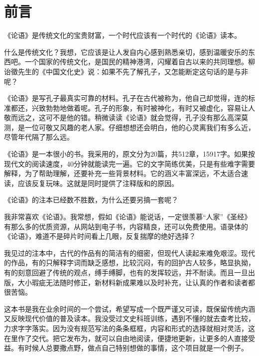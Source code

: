 \chapter*{前\qquad 言}

《论语》是传统文化的宝贵财富，一个时代应该有一个时代的《论语》读本。

什么是传统文化？我想，它应该是让人发自内心感到熟悉亲切，感到温暖安乐的东西吧。一个国家的传统文化，是国民的精神港湾，闪耀着自古以来的共同理想。柳诒徵先生的《中国文化史》说：如果不先了解孔子，又怎能断定这句话的是与非呢？

《论语》是写孔子最真实可靠的材料。孔子在古代被称为，他自己却觉得，连的标准都还，兴致勃勃地做着呢。孔子的形象，有时被神化，有时又被虚化，容易让人敬而远之，这可不是他的错。稍微读读《论语》就会觉得，孔子没有那么高深莫测，是一位可敬又风趣的老人家。仔细想想还会明白，他的心灵离我们有多么近，尽管年代隔了那么远。

《论语》是一本很小的书。我采用的，原文分为20篇，共512章，15917字。如果按现代文的阅读速度，40分钟就能读完一遍。它的文字简练优美，只是有些难字需要解释，为了帮助理解，还要补充一些背景材料。它的涵义丰富深远，不太适合速读，应该反复玩味。这就是同时提供了注释版和的原因。

《论语》的注本已经数不胜数，为什么还要另搞一套呢？

我非常喜欢《论语》。我常想，假如《论语》能说话，一定很羡慕“人家”《圣经》有那么多的优质资源，从网站到电子书，内容精良，还可以免费使用。语录体的《论语》，难道不是碎片时间看上几眼，反复揣摩的绝好选择？

我见过的注本中，古代的作品有的简洁有的细密，但现代人读起来难免艰涩。现代的作品，有的只解释字词而缺乏感想，比较沉闷，有的回护古人较多，略显执拗，有的刻意回避了传统的观点，缚手缚脚，也有的发挥较远，并不耐读。而且一旦出版，大小瑕疵无法随时修正，新材料新成果难以及时补充，让认真的作者和读者都很苦恼。

这本书是我在业余时间的一个尝试，希望写成一个既严谨又可读，既保留传统内涵又反映现代价值的普及读本。我没受过文史科班训练，遇到不懂的就去查考比较，力求字字落实。因为没有规范写法的条条框框，内容和形式的选择就相对灵活，这在里作了交代。把它发布为，就可以自由地阅读，便捷地更新，让更多的人直接受益。有时候人总要撒点野，做点自己特别想做的事情，这个项目就是一个例子。

